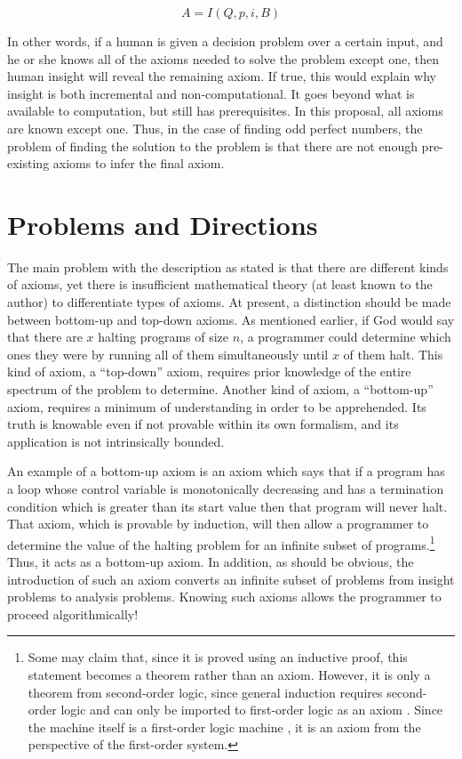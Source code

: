 \begin{equation}
A = I(Q, p, i, B)
\end{equation}

In other words, if a human is given a decision problem over a certain input, and he or she knows all of the axioms needed to solve the problem except one, then human insight will reveal the remaining axiom.  If true, this would explain why insight is both incremental and non-computational.  It goes beyond what is available to computation, but still has prerequisites. In this proposal, all axioms are known except one.  Thus, in the case of finding odd perfect numbers, the problem of finding the solution to the problem is that there are not enough pre-existing axioms to infer the final axiom.

\section{Problems and Directions}

The main problem with the description as stated is that there are different kinds of axioms, yet there is insufficient mathematical theory (at least known to the author) to differentiate types of axioms.  At present, a distinction should be made between bottom-up and top-down axioms.  As mentioned earlier, if God would say that there are $x$ halting programs of size $n$, a programmer could determine which ones they were by running all of them simultaneously until $x$ of them halt.  This kind of axiom, a ``top-down'' axiom, requires prior knowledge of the entire spectrum of the problem to determine.  Another kind of axiom, a ``bottom-up'' axiom, requires a minimum of understanding in order to be apprehended. Its truth is knowable even if not provable within its own formalism, and its application is not intrinsically bounded.  

An example of a bottom-up axiom is an axiom which says that if a program has a loop whose control variable is monotonically decreasing and has a termination condition which is greater than its start value then that program will never halt.  That axiom, which is provable by induction, will then allow a programmer to determine the value of the halting problem for an infinite subset of programs.\footnote{Some may claim that, since it is proved using an inductive proof, this statement becomes a theorem rather than an axiom.  However, it is only a theorem from second-order logic, since general induction requires second-order logic and can only be imported to first-order logic as an axiom \citep{enderton2012}.  Since the machine itself is a first-order logic machine \citep{turing1936}, it is an axiom from the perspective of the first-order system.}  Thus, it acts as a bottom-up axiom.  In addition, as should be obvious, the introduction of such an axiom converts an infinite subset of problems from insight problems to analysis problems.  Knowing such axioms allows the programmer to proceed algorithmically!

